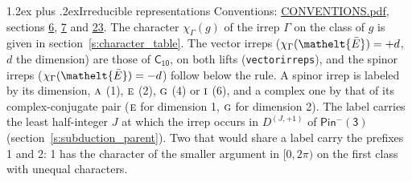 \documentclass[10pt,a4paper]{article}
\makeatletter
\renewcommand\section{\@startsection{section}{1}{\z@}{-3ex plus -1ex minus -.2ex}%
  {1.2ex plus .2ex}{\normalfont\large\sffamily\bfseries\color{parttitle}}}
\numberwithin{equation}{section}
\newcommand{\eltfont}[1]{{\let\sigma\eltsigma\mathelt{#1}}}
\newcommand{\grp}[1]{\mathsf{#1}}
\newcommand{\irr}[1]{\text{\normalfont\scshape #1}}
\newcommand{\elt}[1]{\eltfont{#1}}
\newcommand{\irrJp}[2]{D^{(#1,#2)}}
\newcommand{\irchar}[1]{\chi_{#1}}
\newcommand{\barred}[1]{\bar{#1}}
\makeatother
\begin{document}
\section{Irreducible representations}\label{s:irreps}
Conventions: \href{../../CONVENTIONS.pdf}{CONVENTIONS.pdf}, sections \href{../../../rotation/CONVENTIONS.pdf\#conv.6}{6}, \href{../../../rotation/CONVENTIONS.pdf\#conv.7}{7} and \href{../../CONVENTIONS.pdf\#conv.23}{23}.
\leavevmode\label{n:function.character}\label{n:irrep.Gamma}The character $\irchar{\Gamma}(g)$ of the irrep $\Gamma$ on the class of $g$ is given in section~\ref{s:character_table}. \label{n:index.dimension}The vector irreps ($\irchar{\Gamma}(\elt{\barred{E}}) = +d$, $d$ the dimension) are those of \href{../../../rotation/data/pdf/C10.pdf}{$\grp{C_{10}}$}, on both lifts (\texttt{vectorirreps}), and the spinor irreps ($\irchar{\Gamma}(\elt{\barred{E}}) = -d$) follow below the rule. A spinor irrep is labeled by its dimension, $\irr{a}$ (1), $\irr{e}$ (2), $\irr{g}$ (4) or $\irr{i}$ (6), and a complex one by that of its complex-conjugate pair ($\irr{e}$ for dimension 1, $\irr{g}$ for dimension 2). The label carries the least half-integer $J$ at which the irrep occurs in $\irrJp{J}{+1}$ of $\grp{Pin^{-}(3)}$ (section~\ref{s:subduction_parent}). Two that would share a label carry the prefixes 1 and 2: 1 has the character of the smaller argument in $[0, 2\pi)$ on the first class with unequal characters.
\end{document}
